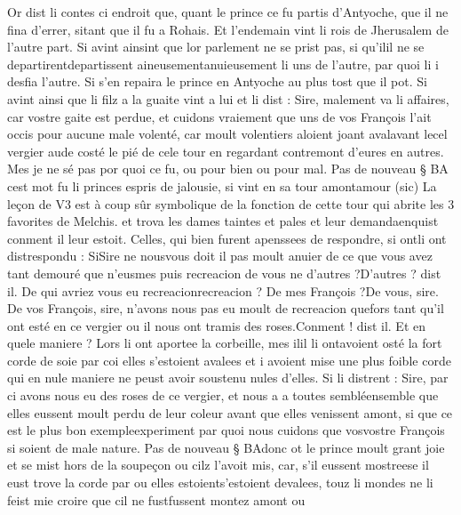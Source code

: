 \documentclass{article}
\begin{document}
\begin{pages}
            
\pstart Or dist li contes ci endroit que, quant 
   le prince ce fu partis d’Antyoche, que il ne fina d’errer, 
   sitant que il fu a Rohais. 
   Et l’endemain vint li rois de Jherusalem 
   de l’autre part. Si avint ainsint que lor parlement ne se prist pas, si qu’ilil ne 
   se departirentdepartissent 
   aineusementanuieusement
   li uns de l’autre, par quoi li i desfia l’autre. Si s’en repaira 
   le prince en Antyoche au plus tost que il pot. 
   Si avint ainsi que li filz a la guaite vint a lui et li dist :
   Sire, malement va li affaires, car vostre gaite est perdue, 
   et cuidons vraiement que uns de vos François l’ait occis pour aucune male volenté, 
      car moult volentiers aloient joant avalavant 
      lecel vergier 
      aude costé le pié de 
   cele tour en regardant contremont d’eures en autres. 
   Mes je ne sé pas por quoi ce fu, ou pour bien ou pour mal. \pend
\pstart Pas de nouveau § BA cest mot fu 
   li princes espris de jalousie, si vint en 
   sa tour amontamour (sic) 
   La leçon de V3 est à coup sûr symbolique de la fonction de cette tour qui abrite les 3 favorites de Melchis.
   et trova les dames taintes et pales et leur demandaenquist 
   conment il leur estoit. Celles, qui bien furent apenssees 
   de respondre, si ontli ont 
   distrespondu :
   SiSire ne 
      nousvous doit il pas moult anuier de ce que vous avez tant demouré 
   que n’eusmes puis recreacion de vous ne d’autres ?D’autres ? dist il. De qui avriez vous eu 
      recreacionrecreacion ? De mes François ?De vous, sire. De vos François, sire, 
      n’avons nous pas eu moult de recreacion quefors tant qu’il ont esté en 
   ce vergier ou il nous ont tramis des roses.Conment ! dist il. Et en quele maniere ?
   Lors li ont aportee la corbeille, mes ilil li 
   ontavoient osté la fort corde 
   de soie par coi elles s’estoient avalees et i avoient mise une 
   plus foible corde qui en nule maniere ne peust avoir soustenu nules d’elles. 
   Si li distrent :
   Sire, par ci avons nous eu des roses de 
      ce vergier, 
      et nous a a toutes sembléensemble que elles eussent moult perdu 
      de leur coleur avant que elles venissent amont, si que ce est le plus bon 
      exempleexperiment par quoi nous cuidons que 
      vosvostre François si soient de male nature. \pend 
\pstart Pas de nouveau § BAdonc ot 
   le prince moult grant joie et se mist hors de la soupeçon ou cilz l’avoit mis, car, 
   s’il eussent mostreese il eust trove la corde par ou elles 
   estoients’estoient devalees, touz li mondes ne li feist mie 
      croire que cil ne fustfussent montez amont ou 

\end{pages}
\end{document}
